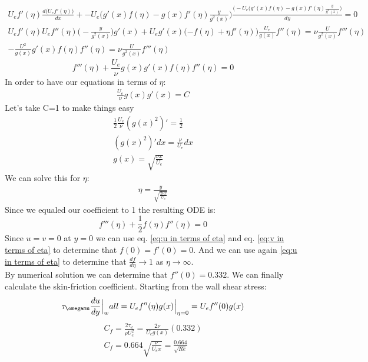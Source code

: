 \documentclass{article}
\begin{document}
\begin{align*}
    U_ef'(\eta) \frac{d\Big(U_ef'(\eta)\big)}{dx}+ -U_e\Big(g'(x)f(\eta)-g(x)f'(\eta)\frac{y}{g^2(x)}\Big)\frac{\Big(-U_e\Big(g'(x)f(\eta)-g(x)f'(\eta)\frac{y}{g^2(x)}\Big)}{dy} = 0 \\
    U_ef'(\eta)U_ef''(\eta)\Big(-\frac{y}{g^2(x)}\Big)g'(x)+U_eg'(x)(-f(\eta)+\eta f'(\eta)\Big)\frac{U_e}{g(x)}f''(\eta) = \nu \frac{U}{g^2(x)}f'''(\eta) \\
    -\frac{U^2}{g(x)}g'(x)f(\eta)f''(\eta)=\nu \frac{U}{g^2(x)}f'''(\eta)
\end{align*}
\begin{equation}
    f'''(\eta)+\frac{U_e}{\nu}g(x)g'(x)f(\eta)f''(\eta)=0
\end{equation}
In order to have our equations in terms of $\eta$: \\
\begin{align*}
    \frac{U_e}{\nu}g(x)g'(x)=C
\end{align*}
Let's take C=1 to make things easy \\
\begin{align*}
    \frac{1}{2}\frac{U_e}{\nu}(g(x)^2)'=\frac{1}{2} \\
    (g(x)^{2})' dx = \frac{\nu}{U_e}dx \\
    g(x)=\sqrt{\frac{\nu x}{U_e}}
\end{align*}
We can solve this for $\eta$:
\begin{align*}
    \eta = \frac{y}{\sqrt{\frac{2\nu x}{U_e}}}
\end{align*}
Since we equaled our coefficient to 1 the resulting ODE is:
\begin{equation}
    f'''(\eta)+\frac{1}{2}f(\eta)f''(\eta)=0
\end{equation}
Since $u=v=0$ at $y=0$ we can use eq. \ref{eq:u in terms of eta} and eq. \ref{eq:v in terms of eta} to determine that $f(0)=f'(0)=0$. And we can use again \ref{eq:u in terms of eta} to determine that $\frac{df}{d\eta} \to 1$ as $\eta \to \infty$. \\
By numerical solution we can determine that $f''(0)=0.332$. We can finally calculate the skin-friction coefficient. Starting from the wall shear stress:\\
\begin{align*}
    \tau_\omegamu\frac{du}{dy}\Big|_wall=U_ef''(\eta)g(x)\Big|_{\eta=0}=U_ef''(0)g(x)
\end{align*}
\begin{align*}
    C_f=\frac{2\tau_\omega}{\rho U_e^2}=\frac{2\nu}{U_eg(x)}(0.332)\\
    C_f= 0.664\sqrt{\frac{\nu}{U_ex}}=\frac{0.664}{\sqrt{Re}}
\end{align*}
\end{document}
